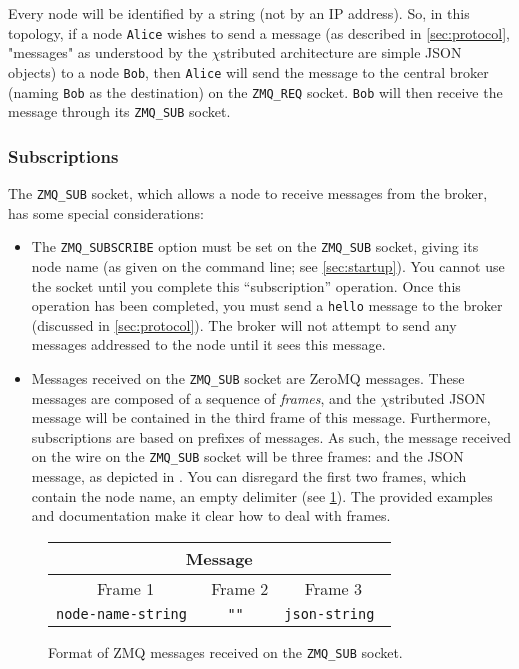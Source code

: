 \documentclass[12pt]{article}
\newcommand{\chistributed}{$\chi$\textsf{stributed} }
\begin{document}
Every node will be identified by a string (not by an IP address). So, in this topology, if a node {\tt Alice} wishes to send a message (as described in \cref{sec:protocol}, "messages" as understood by the \chistributed architecture are simple JSON objects) to a node {\tt Bob}, then {\tt Alice} will send the message to the central broker (naming {\tt Bob} as the destination) on the {\tt ZMQ\_REQ} socket. {\tt Bob} will then receive the message through its {\tt ZMQ\_SUB} socket.

\subsubsection{Subscriptions}

The {\tt ZMQ\_SUB} socket, which allows a node to receive messages from the broker, has some special considerations:

\begin{itemize}
\item The {\tt ZMQ\_SUBSCRIBE} option must be set on the {\tt ZMQ\_SUB} socket, giving its node name (as given on the command line; see \cref{sec:startup}). You cannot use the socket until you complete this ``subscription'' operation. Once this operation has been completed, you must send a {\tt hello} message to the broker (discussed in \cref{sec:protocol}). The broker will not attempt to send any messages addressed to the node until it sees this message. 

\item Messages received on the {\tt ZMQ\_SUB} socket are ZeroMQ messages. These messages are composed of a sequence of {\em frames}, and the \chistributed JSON message will be contained in the third frame of this message. Furthermore, subscriptions are based on prefixes of messages. As such, the message received on the wire on the {\tt ZMQ\_SUB} socket will be three frames:  and the JSON message, as depicted in . You can disregard the first two frames, which contain the node name, an empty delimiter (see \cref{fig:messageframes}). The provided examples and documentation make it clear how to deal with frames.
\end{itemize}

\begin{figure}
\centering
\begin{tabular}{|c|c|c|}
\hline
\multicolumn{3}{|c|}{Message} \\ \hline
Frame 1 & Frame 2 & Frame 3 \\ \hline
\tt node-name-string & \tt "" & \tt json-string \\ \hline
\end{tabular}
\caption{Format of ZMQ messages received on the {\tt ZMQ\_SUB} socket.}
\label{fig:messageframes}
\end{figure}
\end{document}
